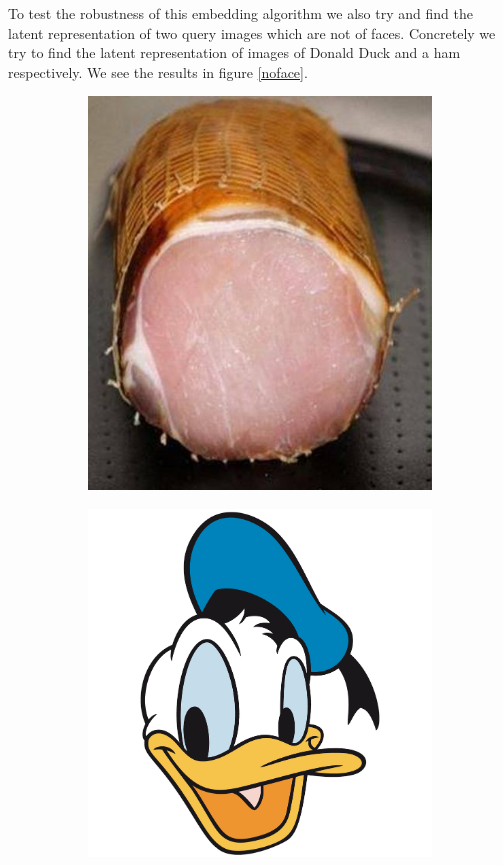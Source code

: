 To test the robustness of this embedding algorithm we also try and find the latent representation of two query images which are not of faces. Concretely we try to find the latent representation of images of Donald Duck and a ham respectively. We see the results in figure \ref{noface}.

\begin{figure}[h!]
    \centering
    \begin{subfigure}[b]{0.24\textwidth}
        \includegraphics[width=\textwidth]{fig/stylegan/noface/skinke}
    \end{subfigure}
    \begin{subfigure}[b]{0.24\textwidth}
        \includegraphics[width=\textwidth]{fig/stylegan/noface/and}

\end{subfigure}
\end{figure}
